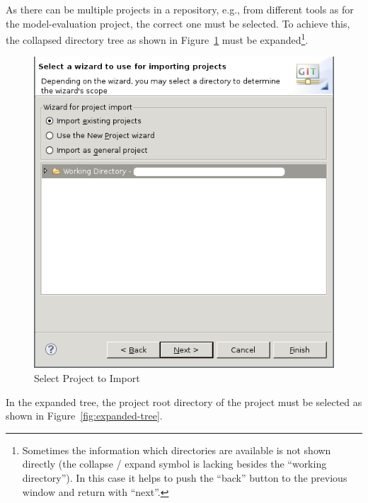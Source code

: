 \documentclass[10pt,a4paper]{article}
\newcommand{\skalierung}{.6}
\begin{document}
As there can be multiple projects in a repository, e.g., from different tools as
for the model-evaluation project, the correct one must be selected. To achieve
this, the collapsed directory tree as shown in
Figure~\ref{fig:select-project-import} must be expanded\footnote{Sometimes the
  information which directories are available is not shown directly (the
  collapse / expand symbol is lacking besides the ``working directory''). In
  this case it helps to push the ``back'' button to the previous window and
  return with ``next''.}.

\begin{figure}[H]
  \centering
  \includegraphics[width=\skalierung\textwidth]{project_import_step6}
  \caption{Select Project to Import}
  \label{fig:select-project-import}
\end{figure}

In the expanded tree, the project root directory of the project must be selected
as shown in Figure~\ref{fig:expanded-tree}.
\end{document}
